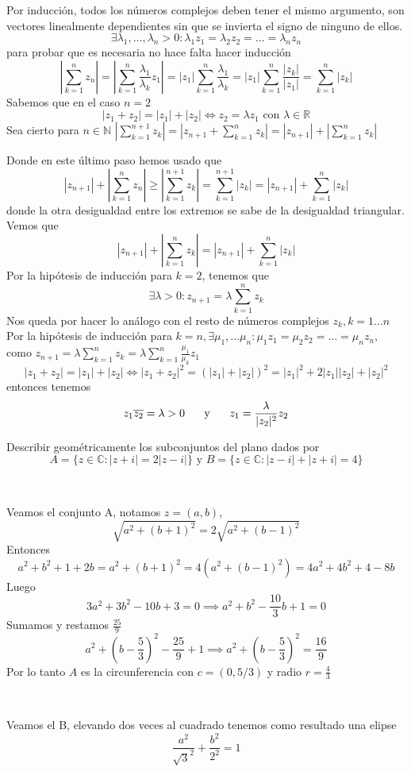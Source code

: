 \begin{sol}



Por inducción, todos los números complejos deben tener el mismo argumento, son vectores linealmente dependientes sin que se invierta el signo de ninguno de ellos.
$$\exists\lambda_1,...,\lambda_n>0 : \lambda_1 z_1 = \lambda_2 z_2 = ... = \lambda_n z_n$$
para probar que es necesaria no hace falta hacer inducción
$$ \left|\sum_{k=1}^n z_n\right| 
=
\left|\sum_{k=1}^n \frac{\lambda_1}{\lambda_k} z_1\right| 
=
|z_1|\sum_{k=1}^n \frac{\lambda_1}{\lambda_k} 
=
|z_1|\sum_{k=1}^n \frac{|z_k|}{|z_1|} 
=
\sum_{k=1}^n |z_k|$$
Sabemos que en el caso $n=2$
$$|z_1+z_2| = |z_1| + |z_2| \Longleftrightarrow z_2 = \lambda z_1\text{ con }\lambda \in \mathbb{R}$$
Sea cierto para $n\in\mathbb{N}$
$|\sum_{k=1}^{n+1} z_k| 
=
|z_{n+1} + \sum_{k=1}^n z_k|
=
|z_{n+1}| + |\sum_{k=1}^n z_k|$

Donde en este último paso hemos usado que
$$|z_{n+1}|+\left|\sum_{k=1}^nz_n\right| 
\geq 
\left|\sum_{k=1}^{n+1} z_k\right|=\sum_{k=1}^{n+1} |z_k| = |z_{n+1}| + \sum_{k=1}^n |z_k|$$
donde la otra desigualdad entre los extremos se sabe de la desigualdad triangular.
Vemos que
$$|z_{n+1}| + \left|\sum_{k=1}^n z_k\right| 
=
|z_{n+1}| + \sum_{k=1}^n |z_k|$$
Por la hipótesis de inducción para $k=2$, tenemos que 
$$\exists \lambda >0 : z_{n+1} = \lambda \sum_{k=1}^n z_k$$
Nos queda por hacer lo análogo con el resto de números complejos $z_k,k=1...n$
Por la hipótesis de inducción para $k=n, \exists \mu_1,...\mu_n : \mu_1 z_1 = \mu_2 z_2=...= \mu_n z_n$,
como $z_{n+1} = \lambda \sum_{k=1}^n z_k 
=
\lambda \sum_{k=1}^n \frac{\mu_1}{\mu_k} z_1$
$$ |z_1+z_2| = |z_1|+|z_2| 
\Longleftrightarrow
|z_1+z_2|^2 = (|z_1|+|z_2|)^2 
=
|z_1|^2 + 2|z_1||z_2|+|z_2|^2$$
 entonces tenemos
$$z_1 \overline{z_2}=\lambda>0 \hspace{0.5cm}\text{ y }\hspace{0.5cm} z_1 = \frac{\lambda}{|z_2|^2 }z_2 
$$

\end{sol}

\begin{ejer}
	Describir geométricamente los subconjuntos del plano dados por
	$$ A=\{ z\in\mathbb{C} : |z+i|=2|z-i| \} \text{ y } B=\{ z\in\mathbb{C} : |z-i| + |z+i| = 4 \} $$
\end{ejer}

\begin{sol}

\

Veamos el conjunto A, notamos $z=(a,b)$,
$$ \sqrt{a^2+(b+1)^2} = 2\sqrt{a^2+(b-1)^2}$$
Entonces $$a^2+b^2+1+2 b = a^2+(b+1)^2 = 4(a^2+(b-1)^2) = 4a^2+4b^2+4-8b$$
Luego
$$3a^2+3b^2-10b+3=0 \implies a^2+b^2-\frac{10}{3}b+1=0$$
Sumamos y restamos $\frac{25}{9}$
$$a^2+\left(b-\frac{5}{3}\right)^2-\frac{25}{9}+1 \implies a^2+(b-\frac{5}{3})^2=\frac{16}{9}$$
Por lo tanto $A$ es la circunferencia con $c=(0,5/3)$ y radio $r=\frac{4}{3}$

\

Veamos el B, elevando dos veces al cuadrado tenemos como resultado una elipse
$$ \frac{a^2}{\sqrt{3}^2} + \frac{b^2}{2^2} = 1 $$
\end{sol}



